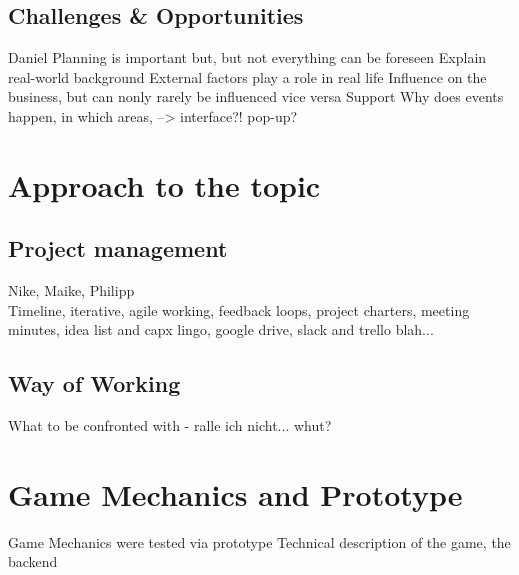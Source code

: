 \documentclass[11pt,titlepage,oneside,openany]{book}
\begin{document}
\section{Challenges \& Opportunities}
Daniel
Planning is important but, but not everything can be foreseen 
Explain real-world background
External factors play a role in real life
Influence on the business, but can nonly rarely be influenced vice versa
Support
Why does events happen, in which areas, --> interface?! pop-up?

\label{sec:evil}

\chapter{Approach to the topic}
\section{Project management}
Nike, Maike, Philipp \\
Timeline, iterative, agile working, feedback loops, project charters, meeting minutes, idea list and capx lingo, google drive, slack and trello blah... 
\section{Way of Working}
What to be confronted with - ralle ich nicht... whut?

\chapter{Game Mechanics and Prototype}
\label{cha:alg}
Game Mechanics were tested via prototype
Technical description of the game, the backend
\end{document}
